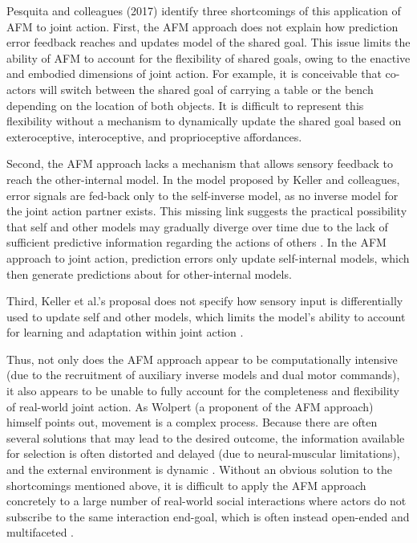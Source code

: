 \begin{CJK}{UTF8}{gbsn}
Pesquita and colleagues (2017) identify three shortcomings of this application of AFM to joint action.  First, the AFM approach does not explain how prediction error feedback reaches and updates model of the shared goal.  This issue limits the ability of AFM to account for the  flexibility of shared goals, owing to the enactive and embodied dimensions of joint action.  For example, it is conceivable that co-actors will switch between the shared goal of carrying a table or the bench depending on the location of both objects.  It is difficult to represent this flexibility without a mechanism to dynamically update the shared goal based on exteroceptive, interoceptive, and proprioceptive affordances.

Second, the AFM approach lacks a mechanism that allows sensory feedback to reach the other-internal model. In the model proposed by Keller and colleagues, error signals are fed-back only to the self-inverse model, as no inverse model for the joint action partner exists. This missing link suggests the practical possibility that self and other models may gradually diverge over time due to the lack of sufficient predictive information regarding the actions of others \citep{Pickering2014}.  In the AFM approach to joint action, prediction errors only update self-internal models, which then generate predictions about for other-internal models.

Third, Keller et al.’s proposal does not specify how sensory input is differentially used to update self and other models, which limits the model's ability to account for learning and adaptation within joint action \citep{Pesquita2017}.


Thus, not only does the AFM approach appear to be computationally intensive (due to the recruitment of auxiliary inverse models and dual motor commands), it also appears to be unable to fully account for the completeness and flexibility of real-world joint action.  As Wolpert (a proponent of the AFM approach) himself points out, movement is a complex process. Because there are often several solutions that may lead to the desired outcome, the information available for selection is often distorted and delayed (due to neural-muscular limitations), and the external environment is dynamic \citep{Wolpert1997}.  Without an obvious solution to the shortcomings mentioned above, it is difficult to apply the AFM approach concretely to a large number of real-world social interactions where actors do not subscribe to the same interaction end-goal, which is often instead open-ended and multifaceted \citep{Pesquita2017}.




\end{CJK}
